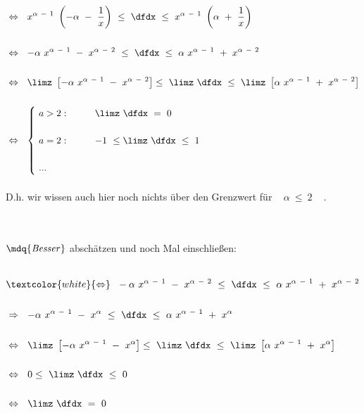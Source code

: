 \begin{description}[leftmargin=*, labelsep=3em, itemsep=3em]
	$\begin{aligned}
	&\Leftrightarrow ~~ x^{\alpha ~ - ~ 1} ~ \left( -\alpha ~ - ~ \frac{1}{x} \right) ~ \leq ~ \dfdx ~ \leq ~ x^{\alpha ~ - ~ 1} ~ \left( \alpha ~ + ~ \frac{1}{x} \right) ~ \\ \\
	&\Leftrightarrow ~~ -\alpha ~ x^{\alpha ~ - ~ 1} ~ - ~ x^{\alpha ~ - ~ 2} ~ \leq ~ \dfdx ~ \leq ~ \alpha ~ x^{\alpha ~ - ~ 1} ~ + ~ x^{\alpha ~ - ~ 2} \\ \\
	&\Leftrightarrow ~~ \limz ~ \left[ -\alpha ~ x^{\alpha ~ - ~ 1} ~ - ~ x^{\alpha ~ - ~ 2} \right] \leq ~ \limz ~ \dfdx ~ \leq ~ \limz ~ \left[ \alpha ~ x^{\alpha ~ - ~ 1} ~ + ~ x^{\alpha ~ - ~ 2} \right] \\ \\
	&\Leftrightarrow ~~ {\begin{cases}
		~ a > 2: \qquad & \limz ~ \dfdx ~ = ~ 0 \\ \\
		~ a = 2: \qquad & -1 ~ \leq \limz ~ \dfdx ~ \leq ~ 1 \\ \\
		~ ... 
	\end{cases}}
	\end{aligned}$ \\
	
	~\\ D.h. wir wissen auch hier noch nichts über den Grenzwert für ~ $\alpha ~ \leq ~ 2$ ~ .
	
	~\\
	~\\
	
	$\mdq{\text{\textit{Besser}}}$ abschätzen und noch Mal einschließen:
	
	~\\
	
	$\begin{aligned}
	&\textcolor{white}{\Leftrightarrow} ~~ -\alpha ~ x^{\alpha ~ - ~ 1} ~ - ~ x^{\alpha ~ - ~ 2} ~ \leq ~ \dfdx ~ \leq ~ \alpha ~ x^{\alpha ~ - ~ 1} ~ + ~ x^{\alpha ~ - ~ 2} \\ \\
	&\Rightarrow ~~ -\alpha ~ x^{\alpha ~ - ~ 1} ~ - ~ x^{\alpha} ~ \leq ~ \dfdx ~ \leq ~ \alpha ~ x^{\alpha ~ - ~ 1} ~ + ~ x^{\alpha} \\ \\
	&\Leftrightarrow ~~ \limz ~ \left[ -\alpha ~ x^{\alpha ~ - ~ 1} ~ - ~ x^{\alpha} \right] \leq ~ \limz ~ \dfdx ~ \leq ~ \limz ~ \left[ \alpha ~ x^{\alpha ~ - ~ 1} ~ + ~ x^{\alpha} \right] \\ \\
	&\Leftrightarrow ~~ 0 \leq ~ \limz ~ \dfdx ~ \leq ~ 0 \\ \\
	&\Leftrightarrow ~~ \limz ~ \dfdx ~ = ~ 0
	\end{aligned}$ \\
	

\end{description}



